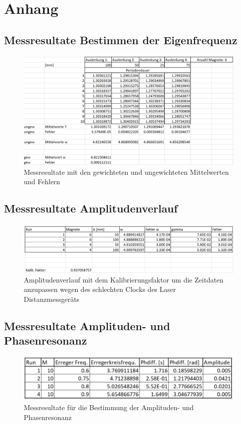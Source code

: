 \chapter*{Anhang}
\thispagestyle{fancy} 
\section*{Messresultate \glqq Bestimmen der Eigenfrequenz\grqq}
\begin{figure}[h]
\centering
\includegraphics[scale=0.8]{Bilder/messungen_eigenfrequenz.png} 
\caption{Messresultate mit den gewichteten und ungewichteten Mittelwerten und Fehlern}
\label{fig:messresultate_bestimmen_eigenfrequenz}
\end{figure}
\section*{Messresultate \glqq Amplitudenverlauf\grqq}
\begin{figure}[h]
\centering
\includegraphics[scale=0.73]{Bilder/messungen_amplitudenverlauf.png} 
\caption{Amplitudenverlauf mit dem Kalibrierungsfaktor um die Zeitdaten anzupassen wegen des schlechten Clocks des Laser Distanzmessgeräts}
\label{fig:messresultate_amplitudenverlauf}
\end{figure}
\newpage
\section*{Messresultate \glqq Amplituden- und Phasenresonanz\grqq}
\begin{figure}[h]
\centering
\includegraphics[scale=1.3]{Bilder/messungen_phasenresonanz.png} 
\caption{Messresultate für die Bestimmung der Amplituden- und Phasenresonanz}
\label{fig:messresultate_phasenresonanz}
\end{figure}
